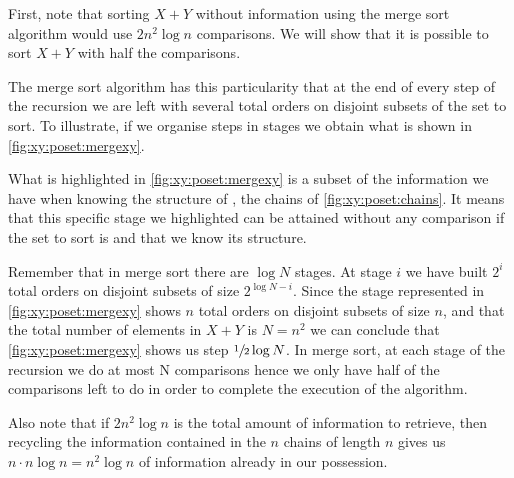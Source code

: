 First, note that sorting $X + Y$ without information using the merge sort
algorithm would use $2 n^2 \log n$ comparisons. We will show that it is
possible to sort $X + Y$ with half the comparisons.

The merge sort algorithm has this particularity that at the end of every step
of the recursion we are left with several total orders on disjoint subsets of
the set to sort. To illustrate, if we organise steps in stages we obtain what
is shown in \ref{fig:xy:poset:mergexy}.

What is highlighted in \ref{fig:xy:poset:mergexy} is a subset of the
information we have when knowing the structure of \XY, \ie the chains of
\ref{fig:xy:poset:chains}. It means that this specific stage we
highlighted can be attained without any comparison if the set to sort is \XY
and that we know its structure.

Remember that in merge sort there are $\log N$ stages. At stage $i$ we have
built $2^{i}$ total orders on disjoint subsets of size $2^{\log N - i}$. Since
the stage represented in \ref{fig:xy:poset:mergexy} shows $n$ total orders on
disjoint subsets of size $n$, and that the total number of elements in $X+Y$ is
$N = n^2$ we can conclude that \ref{fig:xy:poset:mergexy} shows us step
$\sfrac{1}{2} \log N$. In merge sort, at each stage of the recursion we do at
most N comparisons hence we only have half of the comparisons left to do in
order to complete the execution of the algorithm.

Also note that if \(2n^2 \log n\) is the total amount of information to
retrieve, then recycling the information contained in the \(n\) chains of
length \(n\) gives us \(n \cdot n \log n = n^2 \log n\) of information already in
our possession.
